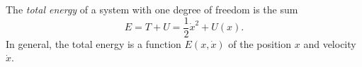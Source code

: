 The \textit{total energy} of a system with one degree of freedom is the sum
$$E = T + U = \frac{1}{2}\dot{x}^2 + U(x).$$
In general, the total energy is a function $E(x, \dot{x})$ of the position $x$ and velocity $\dot{x}$.
